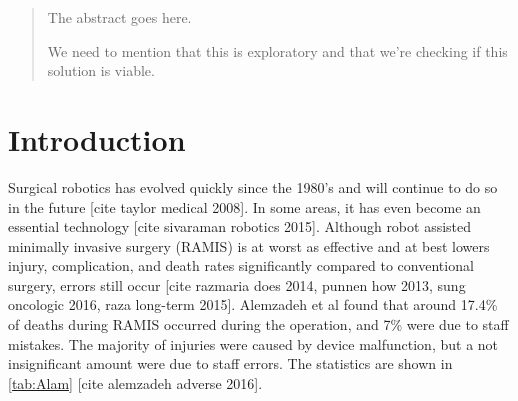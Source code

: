 \documentclass[conference]{IEEEtran}
\begin{document}




\maketitle

\begin{abstract}
The abstract goes here.

We need to mention that this is exploratory and that we're checking if this solution is viable.
\end{abstract}





%
\IEEEpeerreviewmaketitle



\section{Introduction}

Surgical robotics has evolved quickly since the 1980's and will continue to do so in the future [cite taylor medical 2008]. In some areas, it has even become an essential technology [cite sivaraman robotics 2015]. Although robot assisted minimally invasive surgery (RAMIS) is at worst as effective and at best lowers injury, complication, and death rates significantly compared to conventional surgery, errors still occur [cite razmaria does 2014, punnen how 2013, sung oncologic 2016, raza long-term 2015]. Alemzadeh et al found that around 17.4\% of deaths during RAMIS occurred during the operation, and 7\% were due to staff mistakes. The majority of injuries were caused by device malfunction, but a not insignificant amount were due to staff errors. The statistics are shown in \autoref{tab:Alam} [cite alemzadeh adverse 2016].
\end{document}
